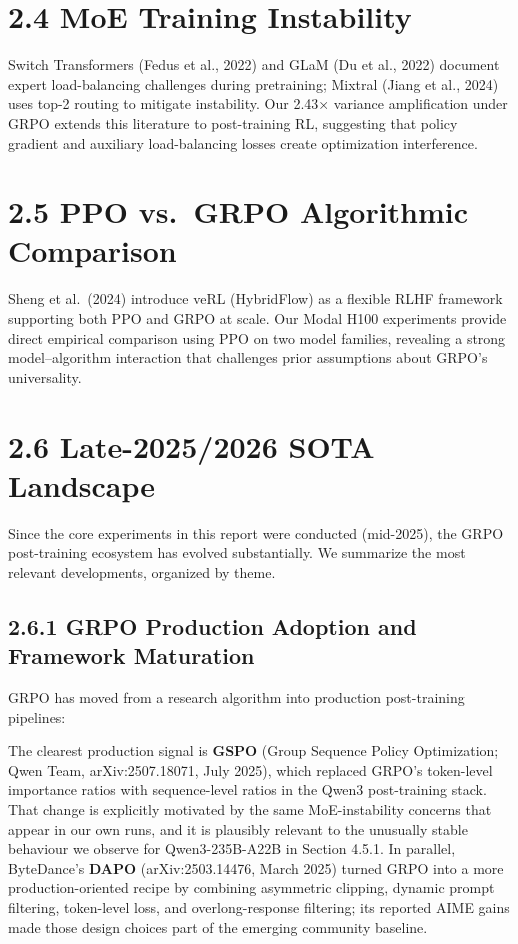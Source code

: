 \documentclass[
  american,
  11pt,
  a4paper,
  oneside]{report}
\begin{document}
\section{2.4 MoE Training Instability}\label{moe-training-instability}

Switch Transformers (Fedus et al., 2022) and GLaM (Du et al., 2022)
document expert load-balancing challenges during pretraining; Mixtral
(Jiang et al., 2024) uses top-2 routing to mitigate instability. Our
2.43× variance amplification under GRPO extends this literature to
post-training RL, suggesting that policy gradient and auxiliary
load-balancing losses create optimization interference.

\section{2.5 PPO vs.~GRPO Algorithmic
Comparison}\label{ppo-vs.-grpo-algorithmic-comparison}

Sheng et al.~(2024) introduce veRL (HybridFlow) as a flexible RLHF
framework supporting both PPO and GRPO at scale. Our Modal H100
experiments provide direct empirical comparison using PPO on two model
families, revealing a strong model--algorithm interaction that
challenges prior assumptions about GRPO's universality.

\section{2.6 Late-2025/2026 SOTA
Landscape}\label{late-20252026-sota-landscape}

Since the core experiments in this report were conducted (mid-2025), the
GRPO post-training ecosystem has evolved substantially. We summarize the
most relevant developments, organized by theme.

\subsection{2.6.1 GRPO Production Adoption and Framework
Maturation}\label{grpo-production-adoption-and-framework-maturation}

GRPO has moved from a research algorithm into production post-training
pipelines:

The clearest production signal is \textbf{GSPO} (Group Sequence Policy
Optimization; Qwen Team, arXiv:2507.18071, July 2025), which replaced
GRPO's token-level importance ratios with sequence-level ratios in the
Qwen3 post-training stack. That change is explicitly motivated by the
same MoE-instability concerns that appear in our own runs, and it is
plausibly relevant to the unusually stable behaviour we observe for
Qwen3-235B-A22B in Section 4.5.1. In parallel, ByteDance's \textbf{DAPO}
(arXiv:2503.14476, March 2025) turned GRPO into a more
production-oriented recipe by combining asymmetric clipping, dynamic
prompt filtering, token-level loss, and overlong-response filtering; its
reported AIME gains made those design choices part of the emerging
community baseline.
\end{document}
